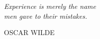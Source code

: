 

\frontmatter %

\pagestyle{plain} %


\maketitlepage

\clearpage

\thispagestyle{empty}
\null\vfill

\settowidth{}
\centering
\parbox{\longest}{%
  \raggedright{\huge\itshape%
   Experience is merely the name \\ 
   men gave to their mistakes.\par\bigskip
  }   
  \raggedleft\Large\MakeUppercase{Oscar Wilde}\par%
}

\vfill\vfill

\clearpage
\raggedright
%




